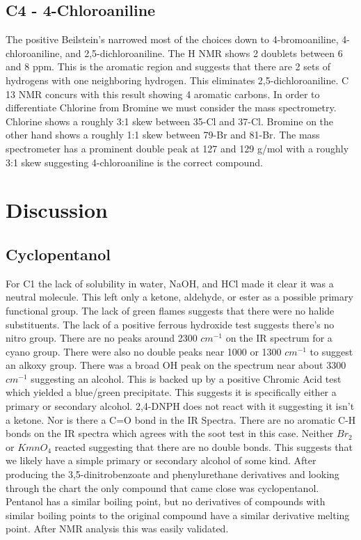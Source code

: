 \documentclass[11pt]{article}
\begin{document}
	\subsection{C4 - 4-Chloroaniline}
	The positive Beilstein's narrowed most of the choices down to 4-bromoaniline, 4-chloroaniline, and 2,5-dichloroaniline. The H NMR shows 2 doublets between 6 and 8 ppm. This is the aromatic region and suggests that there are 2 sets of hydrogens with one neighboring hydrogen. This eliminates 2,5-dichloroaniline. C 13 NMR concurs with this result showing 4 aromatic carbons. In order to differentiate Chlorine from Bromine we must consider the mass spectrometry. Chlorine shows a roughly 3:1 skew between 35-Cl and 37-Cl. Bromine on the other hand shows a roughly 1:1 skew between 79-Br and 81-Br. The mass spectrometer has a prominent double peak at 127 and 129 g/mol with a roughly 3:1 skew suggesting 4-chloroaniline is the correct compound.
	\pagebreak
	\section{Discussion}
	\subsection{Cyclopentanol}
	For C1 the lack of solubility in water, NaOH, and HCl made it clear it was a neutral molecule. This left only a ketone, aldehyde, or ester as a possible primary functional group. The lack of green flames suggests that there were no halide substituents. The lack of a positive ferrous hydroxide test suggests there's no nitro group. There are no peaks around 2300 $cm^{-1}$ on the IR spectrum for a cyano group. There were also no double peaks near 1000 or 1300 $cm^{-1}$ to suggest an alkoxy group. There was a broad OH peak on the spectrum near about 3300 $cm^{-1}$ suggesting an alcohol. This is backed up by a positive Chromic Acid test which yielded a blue/green precipitate. This suggests it is specifically either a primary or secondary alcohol. 2,4-DNPH does not react with it suggesting it isn't a ketone. Nor is there a C=O bond in the IR Spectra. There are no aromatic C-H bonds on the IR spectra which agrees with the soot test in this case. Neither $Br_2$ or $KmnO_4$ reacted suggesting that there are no double bonds. This suggests that we likely have a simple primary or secondary alcohol of some kind. After producing the 3,5-dinitrobenzoate and phenylurethane derivatives and looking through the chart the only compound that came close was cyclopentanol. Pentanol has a similar boiling point, but no derivatives of compounds with similar boiling points to the original compound have a similar derivative melting point. After NMR analysis this was easily validated.
	
\end{document}
